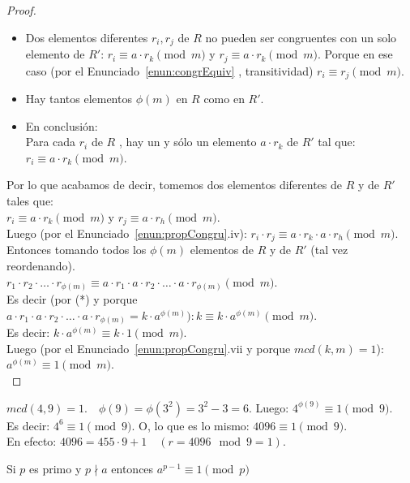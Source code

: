 \begin{proof}
\begin{itemize}
  \item Dos elementos diferentes $r_{i}, r_{j}$ de $R$ no pueden ser congruentes con un solo elemento de $R'$: $r_{i} \equiv a \cdot r_{k} \pmod m$ y $r_{j} \equiv a \cdot r_{k} \pmod m$. Porque en ese caso (por el Enunciado~\ref{enun:congrEquiv} , transitividad) $r_{i} \equiv r_{j} \pmod m$.
\item Hay tantos elementos $\phi(m)$ en $R$ como en $R'$.
\item En conclusión: \\
Para cada $r_{i}$ de $R$ , hay un y sólo un elemento $a \cdot r_{k}$ de $R'$ tal que: $r_{i} \equiv a \cdot r_{k} \pmod m$.
\end{itemize}
Por lo que acabamos de decir, tomemos dos elementos diferentes de $R$ y de $R'$ tales que: \\
$r_{i} \equiv a \cdot r_{k} \pmod m$ y $r_{j} \equiv a \cdot r_{h} \pmod m$. \\
Luego (por el Enunciado~\ref{enun:propCongru}.iv): $r_{i} \cdot r_{j} \equiv a \cdot r_{k} \cdot a \cdot r_{h} \pmod m$. \\
Entonces tomando todos los $\phi(m)$ elementos de $R$ y de $R'$ (tal vez reordenando). \\
$r_{1} \cdot r_{2} \cdot \ldots \cdot r_{\phi(m)} \equiv a \cdot r_{1} \cdot a \cdot r_{2} \cdot \ldots \cdot a \cdot r_{\phi(m)} \pmod m$. \\
Es decir (por (*) y porque $a \cdot r_{1} \cdot a \cdot r_{2} \cdot \ldots \cdot a \cdot r_{\phi(m)}=k \cdot a^{\phi(m)}): k \equiv k \cdot a^{\phi(m)} \pmod m$. \\
Es decir: $k \cdot a^{\phi(m)} \equiv k \cdot 1 \pmod m$. \\
Luego (por el Enunciado~\ref{enun:propCongru}.vii y porque $mcd(k, m)=1$): $a^{\phi(m)} \equiv 1 \pmod m$. \\
\end{proof}

\begin{ejemplo}
$mcd(4,9)=1 . \quad \phi(9)=\phi(3^{2})=3^{2}-3=6$. Luego: $4^{\phi(9)} \equiv 1 \pmod 9$.  \\
Es decir: $4^{6} \equiv 1 \pmod 9$. O, lo que es lo mismo: $4096 \equiv 1 \pmod 9$. \\
En efecto: $4096=455 \cdot 9+1 \quad(r=4096 \mod 9=1)$.
\end{ejemplo}

\begin{enunciado} \label{enun:teorFermat}\leavevmode\par
Si $p$ es primo y $p \nmid a$ entonces $a^{p-1} \equiv 1 \pmod p$
\end{enunciado}

